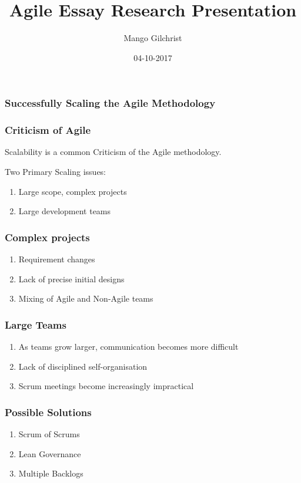 \documentclass{beamer}
\title{Agile Essay Research Presentation}
\date{04-10-2017}
\author{Mango Gilchrist}
\begin{document}
	

\begin{frame}
	\frametitle{Successfully Scaling the Agile Methodology}	
\end{frame}


\begin{frame}
	\frametitle{Criticism of Agile}
	
	Scalability is a common Criticism of the Agile methodology. 
	
	\vspace{5mm}
	
	Two Primary Scaling issues:	
	\begin{enumerate}
		\item Large scope, complex projects
		\item Large development teams
	\end{enumerate}	
\end{frame}


\begin{frame}
	\frametitle{Complex projects}
	
	\begin{enumerate}
		\item Requirement changes
		\item Lack of precise initial designs
		\item Mixing of Agile and Non-Agile teams
	\end{enumerate}
\end{frame}
	
	
\begin{frame}
	\frametitle{Large Teams}
	
	\begin{enumerate}
		\item As teams grow larger, communication becomes more difficult
		\item Lack of disciplined self-organisation
		\item Scrum meetings become increasingly impractical
	\end{enumerate}
\end{frame}


\begin{frame}
	\frametitle{Possible Solutions}
	
	\begin{enumerate}
		\item Scrum of Scrums	
		\item Lean Governance
		\item Multiple Backlogs
	\end{enumerate}
\end{frame}
\end{document}
